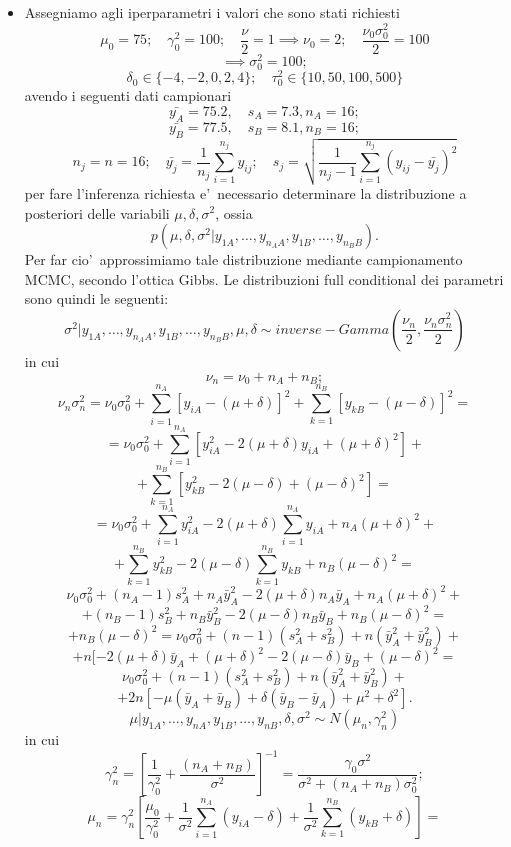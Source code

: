 \begin{itemize}
\item Assegniamo agli iperparametri i valori che sono stati richiesti
\[
\mu_0 = 75; \quad \gamma_0^2 = 100; \quad \frac{\nu}{2} = 1 \implies \nu_0 = 2; \quad \frac{\nu_0\sigma_0^2}{2}=100
\]
\[
\implies \sigma_0^2 = 100;
\]
\[
\delta_0 \in \{-4,-2,0,2,4\}; \quad \tau_0^2 \in \{10,50,100,500\}
\]
avendo i seguenti dati campionari
\[
\bar{y_A} = 75.2, \quad s_A = 7.3, n_A = 16;
\]
\[
\bar{y_B} = 77.5, \quad s_B = 8.1, n_B = 16;
\]
\[
n_j=n=16; \quad \bar{y_j}=\frac{1}{n_j}\sum_{i=1}^{n_j}y_{ij}; \quad s_j = \sqrt{\frac{1}{n_j-1}\sum_{i=1}^{n_j}(y_{ij}-\bar{y_j})^2}
\]
per fare l'inferenza richiesta e'\ necessario determinare la distribuzione a posteriori delle variabili $\mu,\delta,\sigma^2$, ossia
$$p(\mu,\delta,\sigma^2|y_{1A},\dots,y_{n_AA},y_{1B},\dots,y_{n_BB}).$$ 
Per far cio'\ approssimiamo tale distribuzione mediante campionamento MCMC, secondo l'ottica Gibbs. Le distribuzioni full conditional dei parametri sono quindi le seguenti:
\[
\sigma^2 | y_{1A},\dots,y_{n_AA},y_{1B},\dots,y_{n_BB}, \mu, \delta \sim inverse-Gamma(\frac{\nu_n}{2},\frac{\nu_n\sigma_n^2}{2}) 
\]
in cui 
\[
\nu_n = \nu_0 + n_A + n_B;
\]
\[
\nu_n \sigma_n^2=\nu_0\sigma_0^2+\sum_{i=1}^{n_A}[y_{iA}-(\mu+\delta)]^2+ \sum_{k=1}^{n_B}[y_{kB}-(\mu-\delta)]^2=
\]
\[
=\nu_0\sigma_0^2 + \sum_{i=1}^{n_A}[y_{iA}^2-2(\mu+\delta)y_{iA} + (\mu + \delta)^2] +
\]
\[
 +\sum_{k=1}^{n_B}[y_{kB}^2-2(\mu-\delta) + (\mu - \delta)^2]=
\]
\[
=\nu_0\sigma_0^2 + \sum_{i=1}^{n_A}y_{iA}^2 - 2(\mu + \delta)\sum_{i=1}^{n_A}y_{iA} + n_A(\mu + \delta)^2+ 
\]
\[
+ \sum_{k=1}^{n_B}y_{kB}^2 - 2(\mu-\delta)\sum_{k=1}^{n_B}y_{kB} + n_B(\mu-\delta)^2=
\]
\[
\nu_0\sigma_0^2+(n_A-1)s_A^2+n_A\bar{y}_A^2-2(\mu + \delta)n_A\bar{y}_A+n_{A}(\mu+\delta)^2+
\]
\[
+(n_B-1)s_B^2+n_B\bar{y}_B^2-2(\mu-\delta)n_B\bar{y}_B+n_B(\mu-\delta)^2=
\]
\[
+n_B(\mu-\delta)^2=\nu_0\sigma_0^2 +(n-1)(s_A^2+s_B^2)+n(\bar{y}_A^2+\bar{y}_B^2)+
\]
\[
+n[-2(\mu+\delta)\bar{y}_A+(\mu+\delta)^2-2(\mu-\delta)\bar{y}_B+(\mu-\delta)^2=
\]
\[
\nu_0\sigma_0^2+(n-1)(s_A^2+s_B^2)+n(\bar{y}_A^2+\bar{y}_B^2)+
\]
\[
+2n[-\mu(\bar{y}_A+\bar{y}_B)+\delta(\bar{y}_B-\bar{y}_A)+\mu^2 + \delta^2].
\]
\[
\mu|y_{1A},\dots,y_{nA},y_{1B},\dots,y_{nB},\delta,\sigma^2 \sim N(\mu_n,\gamma_n^2)
\]
in cui 
\[
\gamma_n^2=[\frac{1}{\gamma_0^2}+\frac{(n_A+n_B)}{\sigma^2}]^{-1} = \frac{\gamma_0\sigma^2}{\sigma^2+(n_A+n_B)\sigma_0^2};
\]
\[
\mu_n =\gamma_n^2[\frac{\mu_0}{\gamma_0^2}+\frac{1}{\sigma^2}\sum_{i=1}^{n_A}(y_{iA}-\delta)+\frac{1}{\sigma^2}\sum_{k=1}^{n_B}(y_{kB}+\delta)]= 
\]
\end{itemize}
